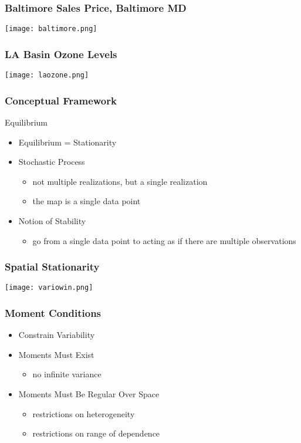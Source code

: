 \documentclass[nototal,handout]{beamer}
\begin{document}
\begin{frame}[<+->]
  \frametitle{Baltimore Sales Price, Baltimore MD}
    \begin{center}
      \texttt{[image: baltimore.png]}
    \end{center}
 \end{frame}


\begin{frame}[<+->]
  \frametitle{LA Basin Ozone Levels}
    \begin{center}
      \texttt{[image: laozone.png]}
    \end{center}
 \end{frame}

 \begin{frame}
   \frametitle{Conceptual Framework}
   \begin{block}{Equilibrium}
     \begin{itemize}
       \item Equilibrium = Stationarity
       \item Stochastic Process
	 \begin{itemize}
	   \item not multiple realizations, but a single realization
	   \item the map is a single data point
	 \end{itemize}
       \item Notion of Stability
	 \begin{itemize}
	   \item go from a single data point to acting as if there are
	     multiple observations
	 \end{itemize}

     \end{itemize}
    \end{block}
  \end{frame}


\begin{frame}[<+->]
  \frametitle{Spatial Stationarity}
    \begin{center}
      \texttt{[image: variowin.png]}
    \end{center}
 \end{frame}

 \begin{frame}
   \frametitle{Moment Conditions}
   \begin{itemize}
     \item Constrain Variability
     \item Moments Must Exist
       \begin{itemize}
	 \item no infinite variance
       \end{itemize}
     \item Moments Must Be Regular Over Space
   \begin{itemize}
     \item restrictions on heterogeneity
     \item restrictions on range of dependence
   \end{itemize}
   \end{itemize}
  \end{frame}
\end{document}
